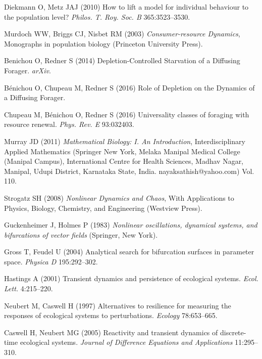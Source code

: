 \documentclass{pnastwo}
\begin{document}
\begin{article}
\begin{thebibliography}{10}
Diekmann O, Metz JAJ
\newblock (2010) {How to lift a model for individual behaviour to the
  population level?}
\newblock \emph{Philos. T. Roy. Soc. B} 365:3523--3530.

Murdoch WW, Briggs CJ, Nisbet RM
\newblock (2003) \emph{{Consumer-resource Dynamics}}, Monographs in population
  biology
\newblock (Princeton University Press).

Benichou O, Redner S
\newblock (2014) {Depletion-Controlled Starvation of a Diffusing Forager}.
\newblock \emph{arXiv}.

B{\'e}nichou O, Chupeau M, Redner S
\newblock (2016) {Role of Depletion on the Dynamics of a Diffusing Forager}.

Chupeau M, B{\'e}nichou O, Redner S
\newblock (2016) {Universality classes of foraging with resource renewal}.
\newblock \emph{Phys. Rev. E} 93:032403.

Murray JD
\newblock (2011) \emph{{Mathematical Biology: I. An Introduction}},
  Interdisciplinary Applied Mathematics
\newblock (Springer New York, Melaka Manipal Medical College (Manipal Campus),
  International Centre for Health Sciences, Madhav Nagar, Manipal, Udupi
  District, Karnataka State, India. nayaksathish@yahoo.com) Vol.{} 110.

Strogatz SH
\newblock (2008) \emph{{Nonlinear Dynamics and Chaos}}, With Applications to
  Physics, Biology, Chemistry, and Engineering
\newblock (Westview Press).

Guckenheimer J, Holmes P
\newblock (1983) \emph{{Nonlinear oscillations, dynamical systems, and
  bifurcations of vector fields}}
\newblock (Springer, New York).

Gross T, Feudel U
\newblock (2004) {Analytical search for bifurcation surfaces in parameter
  space}.
\newblock \emph{Physica D} 195:292--302.

Hastings A
\newblock (2001) {Transient dynamics and persistence of ecological systems}.
\newblock \emph{Ecol. Lett.} 4:215--220.

Neubert M, Caswell H
\newblock (1997) {Alternatives to resilience for measuring the responses of
  ecological systems to perturbations}.
\newblock \emph{Ecology} 78:653--665.

Caswell H, Neubert MG
\newblock (2005) {Reactivity and transient dynamics of discrete-time ecological
  systems}.
\newblock \emph{Journal of Difference Equations and Applications} 11:295--310.


\end{thebibliography}
\end{article}
\end{document}
